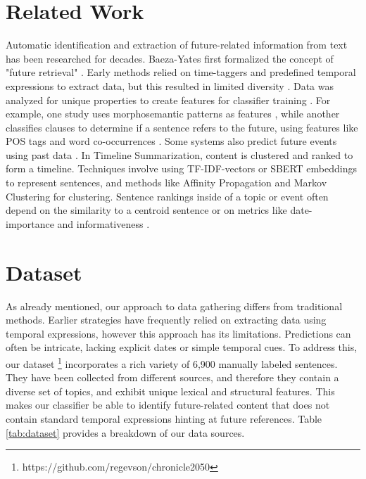 \documentclass[sigconf]{acmart}
\begin{document}
\section{Related Work}
Automatic identification and extraction of future-related information from text has been researched for decades. Baeza-Yates \cite{BaezaYatesSearchingTF} first formalized the concept of "future retrieval" . Early methods relied on time-taggers and predefined temporal expressions to extract data, but this resulted in limited diversity \cite{chronoseeker, supportingAnalysis, analyzingCollective, rankingRelated, extractingCollective}. Data was analyzed for unique properties \cite{improvingRetrieval} to create features for classifier training \cite{computationalExploration}.
For example, one study uses morphosemantic patterns as features \cite{automaticExtraction}, while another classifies clauses to determine if a sentence refers to the future, using features like POS tags and word co-occurrences \cite{extractingPredictive}. Some systems also predict future events using past data \cite{miningTheWeb, predictingTheNews}.
In Timeline Summarization, content is clustered and ranked to form a timeline. Techniques involve using TF-IDF-vectors or SBERT embeddings \cite{sbert} to represent sentences, and methods like Affinity Propagation \cite{abstractiveTimeline, multiTimeline} and Markov Clustering \cite{stateOfTheArtTimeline} for clustering. Sentence rankings inside of a topic or event often depend on the similarity to a centroid sentence \cite{stateOfTheArtTimeline} or on metrics like date-importance and informativeness \cite{abstractiveTimeline}.



\section{Dataset}
As already mentioned, our approach to data gathering differs from traditional methods. Earlier strategies have frequently relied on extracting data using temporal expressions, however this approach has its limitations. Predictions can often be intricate, lacking explicit dates or simple temporal cues.
To address this, our dataset \footnote{https://github.com/regevson/chronicle2050} incorporates a rich variety of 6,900 manually labeled sentences. They have been collected from different sources, and therefore they contain a diverse set of topics, and exhibit unique lexical and structural features. This makes our classifier be able to identify future-related content that does not contain standard temporal expressions hinting at future references.
Table \ref{tab:dataset} provides a breakdown of our data sources.
\end{document}
